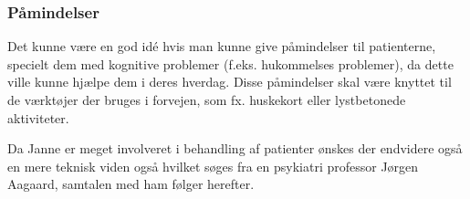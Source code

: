 \subsubsection{Påmindelser}
Det kunne være en god idé hvis man kunne give påmindelser til patienterne, specielt dem med kognitive problemer (f.eks. hukommelses problemer), da dette ville kunne hjælpe dem i deres hverdag.
Disse påmindelser skal være knyttet til de værktøjer der bruges i forvejen, som fx. huskekort eller lystbetonede aktiviteter.

Da Janne er meget involveret i behandling af patienter ønskes der endvidere også en mere teknisk viden også hvilket søges fra en psykiatri professor Jørgen Aagaard, samtalen med ham følger herefter.